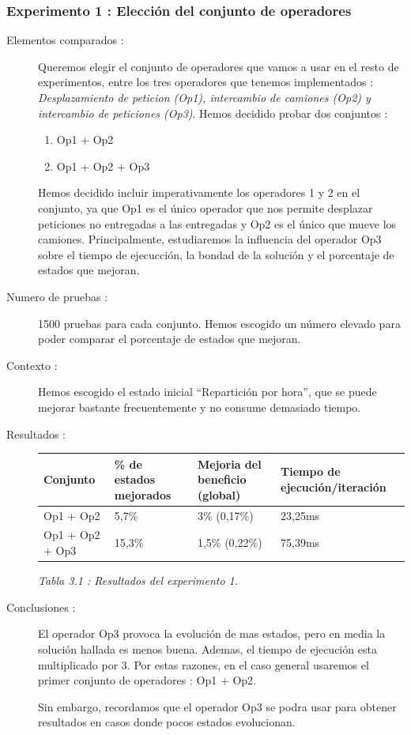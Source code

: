 \documentclass{article}
\begin{document}
\subsubsection{Experimento 1 : Elección del conjunto de operadores}
\begin{description}
\item[Elementos comparados :] Queremos elegir el conjunto de operadores que
vamos a usar en el resto de experimentos, entre los tres operadores que tenemos
implementados : \emph{Desplazamiento de peticion (Op1), intercambio de camiones
(Op2) y intercambio de peticiones (Op3)}. Hemos decidido probar dos conjuntos :
\begin{enumerate}
\item Op1 + Op2
\item Op1 + Op2 + Op3
\end{enumerate}
Hemos decidido incluir imperativamente los operadores 1 y 2 en el conjunto, ya
que Op1 es el único operador que nos permite desplazar peticiones no entregadas
a las entregadas y Op2 es el único que mueve los camiones. Principalmente,
estudiaremos la influencia del operador Op3 sobre el tiempo de ejecucción, la
bondad de la solución y el porcentaje de estados que mejoran.
\item[Numero de pruebas :] 1500 pruebas para cada conjunto. Hemos escogido un
número elevado para poder comparar el porcentaje de estados que mejoran.
\item[Contexto :] Hemos escogido el estado inicial ``Repartición por hora'', que
se puede mejorar bastante frecuentemente y no consume demasiado tiempo.
\item[Resultados :]
\begin{tabular}{|l|l|l|l|}
\hline
Conjunto & \% de estados mejorados & Mejoria del beneficio (global) & Tiempo de
ejecución/iteración\\
\hline
Op1 + Op2 & 5,7\% & 3\% (0,17\%) & 23,25ms\\
\hline
Op1 + Op2 + Op3 & 15,3\% & 1,5\% (0,22\%) & 75,39ms\\
\hline
\end{tabular}
\begin{center}
{\it Tabla 3.1 : Resultados del experimento 1.}
\end{center}

\item[Conclusiones :] El operador Op3 provoca la evolución de mas estados, pero
en media la solución hallada es menos buena. Ademas, el tiempo de ejecución esta
multiplicado por 3. Por estas razones, en el caso general usaremos el primer
conjunto de operadores : Op1 + Op2.

Sin embargo, recordamos que el operador Op3 se podra usar para obtener
resultados en casos donde pocos estados evolucionan.
\end{description}
\end{document}
